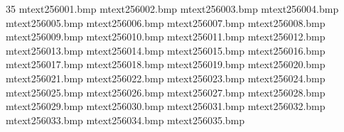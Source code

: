 35
mtext256\text001.bmp
mtext256\text002.bmp
mtext256\text003.bmp
mtext256\text004.bmp
mtext256\text005.bmp
mtext256\text006.bmp
mtext256\text007.bmp
mtext256\text008.bmp
mtext256\text009.bmp
mtext256\text010.bmp
mtext256\text011.bmp
mtext256\text012.bmp
mtext256\text013.bmp
mtext256\text014.bmp
mtext256\text015.bmp
mtext256\text016.bmp
mtext256\text017.bmp
mtext256\text018.bmp
mtext256\text019.bmp
mtext256\text020.bmp
mtext256\text021.bmp
mtext256\text022.bmp
mtext256\text023.bmp
mtext256\text024.bmp
mtext256\text025.bmp
mtext256\text026.bmp
mtext256\text027.bmp
mtext256\text028.bmp
mtext256\text029.bmp
mtext256\text030.bmp
mtext256\text031.bmp
mtext256\text032.bmp
mtext256\text033.bmp
mtext256\text034.bmp
mtext256\text035.bmp
